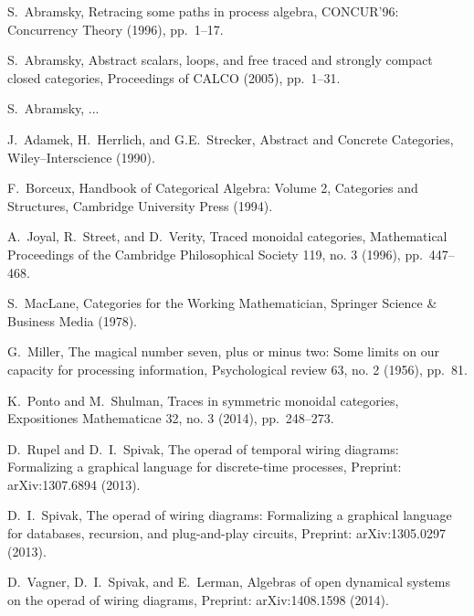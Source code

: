 \documentclass[12pt,oneside,article,draft]{memoir}
\begin{document}
\begin{thebibliography}{XXX}
 S.~Abramsky, Retracing some paths in process algebra, CONCUR'96: Concurrency Theory (1996), pp.~1--17.

 S.~Abramsky, Abstract scalars, loops, and free traced and strongly compact closed categories, Proceedings of CALCO (2005), pp.~1--31.

 S.~Abramsky, ...

 J.~Adamek, H.~Herrlich, and G.E.~Strecker, Abstract and Concrete Categories, Wiley–Interscience (1990).

 F.~Borceux, Handbook of Categorical Algebra: Volume 2, Categories and Structures, Cambridge University Press (1994).

 A.~Joyal, R.~Street, and D.~Verity, Traced monoidal categories, Mathematical Proceedings of the Cambridge Philosophical Society 119, no. 3 (1996), pp.~447--468.

 S.~MacLane, Categories for the Working Mathematician, Springer Science \& Business Media (1978).

 G.~Miller, The magical number seven, plus or minus two: Some limits on our capacity for processing information, Psychological review 63, no. 2 (1956), pp.~81.

 K.~Ponto and M.~Shulman, Traces in symmetric monoidal categories, Expositiones Mathematicae 32, no. 3 (2014), pp.~248--273.

 D.~Rupel and D.~I.~Spivak, The operad of temporal wiring diagrams: Formalizing a graphical language for discrete-time processes, Preprint: arXiv:1307.6894 (2013).

 D.~I.~Spivak, The operad of wiring diagrams: Formalizing a graphical language for databases, recursion, and plug-and-play circuits, Preprint: arXiv:1305.0297 (2013).

 D.~Vagner, D.~I.~Spivak, and E.~Lerman, Algebras of open dynamical systems on the operad of wiring diagrams, Preprint: arXiv:1408.1598 (2014).

\end{thebibliography}
\end{document}
